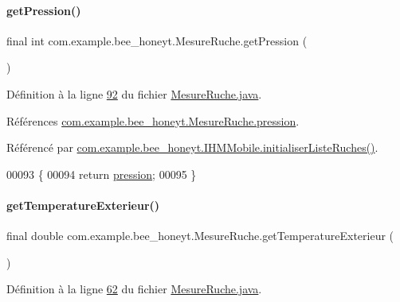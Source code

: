 \paragraph{\texorpdfstring{get\+Pression()}{getPression()}}
{\footnotesize\ttfamily final int com.\+example.\+bee\+\_\+honeyt.\+Mesure\+Ruche.\+get\+Pression (\begin{DoxyParamCaption}{ }\end{DoxyParamCaption})}



Définition à la ligne \hyperlink{_mesure_ruche_8java_source_l00092}{92} du fichier \hyperlink{_mesure_ruche_8java_source}{Mesure\+Ruche.\+java}.



Références \hyperlink{_mesure_ruche_8java_source_l00021}{com.\+example.\+bee\+\_\+honeyt.\+Mesure\+Ruche.\+pression}.



Référencé par \hyperlink{_i_h_m_mobile_8java_source_l00170}{com.\+example.\+bee\+\_\+honeyt.\+I\+H\+M\+Mobile.\+initialiser\+Liste\+Ruches()}.


\begin{DoxyCode}
00093     \{
00094         \textcolor{keywordflow}{return} \hyperlink{classcom_1_1example_1_1bee__honeyt_1_1_mesure_ruche_ae78080a6d5745faa411e3cfbdbf8aeec}{pression};
00095     \}
\end{DoxyCode}
\mbox{\label{classcom_1_1example_1_1bee__honeyt_1_1_mesure_ruche_a8628b499066f185d78ae015ce50557a8}} 
\paragraph{\texorpdfstring{get\+Temperature\+Exterieur()}{getTemperatureExterieur()}}
{\footnotesize\ttfamily final double com.\+example.\+bee\+\_\+honeyt.\+Mesure\+Ruche.\+get\+Temperature\+Exterieur (\begin{DoxyParamCaption}{ }\end{DoxyParamCaption})}



Définition à la ligne \hyperlink{_mesure_ruche_8java_source_l00062}{62} du fichier \hyperlink{_mesure_ruche_8java_source}{Mesure\+Ruche.\+java}.



